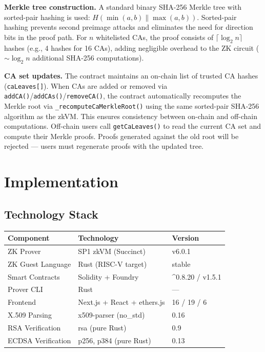 \documentclass[11pt, a4paper]{article}
\begin{document}
\textbf{Merkle tree construction.} A standard binary SHA-256 Merkle tree
\cite{ref25} with sorted-pair hashing is used:
\(H(\min(a,b) \| \max(a,b))\). Sorted-pair hashing prevents second
preimage attacks and eliminates the need for direction bits in the proof
path. For \(n\) whitelisted CAs, the proof consists of
\(\lceil \log_2 n \rceil\) hashes (e.g., 4 hashes for 16 CAs), adding
negligible overhead to the ZK circuit ($\sim${}\(\log_2 n\)
additional SHA-256 computations).

\textbf{CA set updates.} The contract maintains an on-chain list of
trusted CA hashes (\texttt{caLeaves{[}{]}}). When CAs are added or
removed via \texttt{addCA()}/\texttt{addCAs()}/\texttt{removeCA()}, the
contract automatically recomputes the Merkle root via
\texttt{\_recomputeCaMerkleRoot()} using the same sorted-pair SHA-256
algorithm as the zkVM. This ensures consistency between on-chain and
off-chain computations. Off-chain users call \texttt{getCaLeaves()} to
read the current CA set and compute their Merkle proofs. Proofs
generated against the old root will be rejected --- users must
regenerate proofs with the updated tree.


\section{Implementation}\label{implementation}

\subsection{Technology Stack}\label{technology-stack}

\begin{longtable}[]{@{}lll@{}}
\toprule\noalign{}
Component & Technology & Version \\
\midrule\noalign{}
\endhead
\bottomrule\noalign{}
\endlastfoot
ZK Prover & SP1 zkVM (Succinct) & v6.0.1 \\
ZK Guest Language & Rust (RISC-V target) & stable \\
Smart Contracts & Solidity + Foundry & \^{}0.8.20 / v1.5.1 \\
Prover CLI & Rust & --- \\
Frontend & Next.js + React + ethers.js & 16 / 19 / 6 \\
X.509 Parsing & x509-parser (no\_std) & 0.16 \\
RSA Verification & rsa (pure Rust) & 0.9 \\
ECDSA Verification & p256, p384 (pure Rust) & 0.13 \\
\end{longtable}
\end{document}
